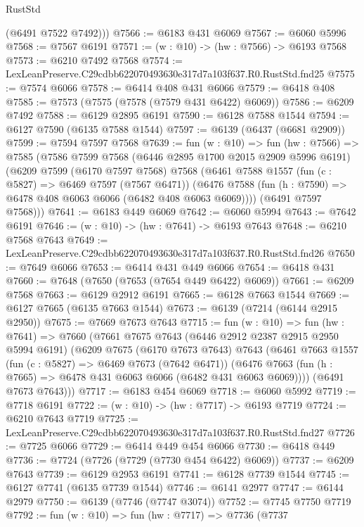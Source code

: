 \begin{lexlean}{RustStd}
\begin{coremodule}
        (@6491 @7522 @7492)))
@7566 := @6183 @431 @6069
@7567 := @6060 @5996
@7568 := @7567 @6191
@7571 := (w : @10) -> (hw : @7566) -> @6193 @7568
@7573 := @6210 @7492 @7568
@7574 := LexLeanPreserve.C29cdbb622070493630e317d7a103f637.R0.RustStd.fnd25
@7575 := @7574 @6066
@7578 := @6414 @408 @431 @6066
@7579 := @6418 @408
@7585 := @7573 (@7575 (@7578 (@7579 @431 @6422) @6069))
@7586 := @6209 @7492
@7588 := @6129 @2895 @6191
@7590 := @6128 @7588 @1544
@7594 := @6127 @7590 (@6135 @7588 @1544)
@7597 := @6139 (@6437 (@6681 @2909))
@7599 := @7594 @7597 @7568
@7639 := fun (w : @10) =>
  fun (hw : @7566) =>
  @7585
    (@7586
      @7599
      @7568
      (@6446 @2895 @1700 @2015 @2909 @5996 @6191)
      (@6209
        @7599
        (@6170 @7597 @7568)
        @7568
        (@6461
          @7588
          @1557
          (fun (c : @5827) => @6469 @7597 (@7567 @6471))
          (@6476 @7588 (fun (h : @7590) => @6478 @408 @6063 @6066 (@6482 @408 @6063 @6069))))
        (@6491 @7597 @7568)))
@7641 := @6183 @449 @6069
@7642 := @6060 @5994
@7643 := @7642 @6191
@7646 := (w : @10) -> (hw : @7641) -> @6193 @7643
@7648 := @6210 @7568 @7643
@7649 := LexLeanPreserve.C29cdbb622070493630e317d7a103f637.R0.RustStd.fnd26
@7650 := @7649 @6066
@7653 := @6414 @431 @449 @6066
@7654 := @6418 @431
@7660 := @7648 (@7650 (@7653 (@7654 @449 @6422) @6069))
@7661 := @6209 @7568
@7663 := @6129 @2912 @6191
@7665 := @6128 @7663 @1544
@7669 := @6127 @7665 (@6135 @7663 @1544)
@7673 := @6139 (@7214 (@6144 @2915 @2950))
@7675 := @7669 @7673 @7643
@7715 := fun (w : @10) =>
  fun (hw : @7641) =>
  @7660
    (@7661
      @7675
      @7643
      (@6446 @2912 @2387 @2915 @2950 @5994 @6191)
      (@6209
        @7675
        (@6170 @7673 @7643)
        @7643
        (@6461
          @7663
          @1557
          (fun (c : @5827) => @6469 @7673 (@7642 @6471))
          (@6476 @7663 (fun (h : @7665) => @6478 @431 @6063 @6066 (@6482 @431 @6063 @6069))))
        (@6491 @7673 @7643)))
@7717 := @6183 @454 @6069
@7718 := @6060 @5992
@7719 := @7718 @6191
@7722 := (w : @10) -> (hw : @7717) -> @6193 @7719
@7724 := @6210 @7643 @7719
@7725 := LexLeanPreserve.C29cdbb622070493630e317d7a103f637.R0.RustStd.fnd27
@7726 := @7725 @6066
@7729 := @6414 @449 @454 @6066
@7730 := @6418 @449
@7736 := @7724 (@7726 (@7729 (@7730 @454 @6422) @6069))
@7737 := @6209 @7643
@7739 := @6129 @2953 @6191
@7741 := @6128 @7739 @1544
@7745 := @6127 @7741 (@6135 @7739 @1544)
@7746 := @6141 @2977
@7747 := @6144 @2979
@7750 := @6139 (@7746 (@7747 @3074))
@7752 := @7745 @7750 @7719
@7792 := fun (w : @10) =>
  fun (hw : @7717) =>
  @7736
    (@7737

\end{coremodule}
\end{lexlean}
